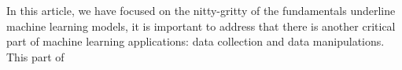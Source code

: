 In this article, we have focused on the nitty-gritty of the fundamentals underline machine learning models, it is important to address that there is another critical part of machine learning applications: data collection and data manipulations. This part of  